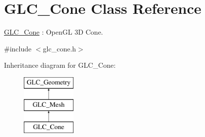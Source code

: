 \hypertarget{class_g_l_c___cone}{\section{G\-L\-C\-\_\-\-Cone Class Reference}
\label{class_g_l_c___cone}
}


\hyperlink{class_g_l_c___cone}{G\-L\-C\-\_\-\-Cone} \-: Open\-G\-L 3\-D Cone.  




{\ttfamily \#include $<$glc\-\_\-cone.\-h$>$}

Inheritance diagram for G\-L\-C\-\_\-\-Cone\-:\begin{figure}[H]
\begin{center}
\leavevmode
\includegraphics[height=3.000000cm]{class_g_l_c___cone}
\end{center}
\end{figure}
